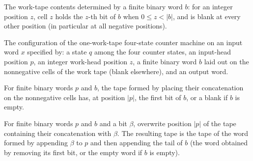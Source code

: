 \begin{definition}
\label{Complexity.counterTape}
\leanok
The work-tape contents determined by a finite binary word $b$: for an integer
position $z$, cell $z$ holds the $z$-th bit of $b$ when $0 \le z < |b|$, and is
blank at every other position (in particular at all negative positions).
\end{definition}

\begin{definition}
\label{Complexity.counterCfg}
\leanok
{}
The configuration of the one-work-tape four-state counter machine on an input
word $x$ specified by: a state $q$ among the four counter states, an input-head
position $p$, an integer work-head position $z$, a finite binary word $b$ laid
out on the nonnegative cells of the work tape (blank elsewhere), and an output
word.
\end{definition}

\begin{lemma}
\label{Complexity.counterTape_read}
\leanok
{}
For finite binary words $p$ and $b$, the tape formed by placing their concatenation on
the nonnegative cells has, at position $|p|$, the first bit of $b$, or a blank if $b$ is
empty.
\end{lemma}

\begin{lemma}
\label{Complexity.counterTape_write}
\leanok
{}
For finite binary words $p$ and $b$ and a bit $\beta$, overwrite position $|p|$ of the
tape containing their concatenation with $\beta$. The resulting tape is the tape of the
word formed by appending $\beta$ to $p$ and then appending the tail of $b$ (the word
obtained by removing its first bit, or the empty word if $b$ is empty).
\end{lemma}


